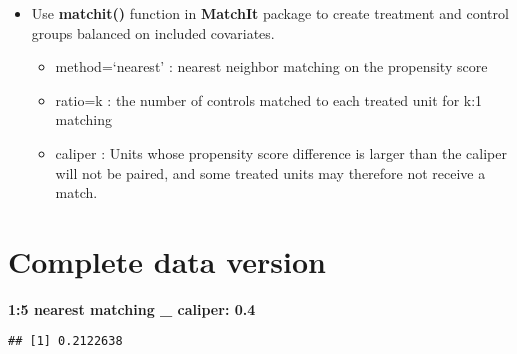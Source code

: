 \documentclass[
]{book}
\newenvironment{Shaded}{\begin{snugshade}}{\end{snugshade}}
\newcommand{\AttributeTok}[1]{\textcolor[rgb]{0.77,0.63,0.00}{#1}}
\newcommand{\DocumentationTok}[1]{\textcolor[rgb]{0.56,0.35,0.01}{\textbf{\textit{#1}}}}
\newcommand{\FloatTok}[1]{\textcolor[rgb]{0.00,0.00,0.81}{#1}}
\newcommand{\FunctionTok}[1]{\textcolor[rgb]{0.00,0.00,0.00}{#1}}
\newcommand{\NormalTok}[1]{#1}
\newcommand{\OtherTok}[1]{\textcolor[rgb]{0.56,0.35,0.01}{#1}}
\newcommand{\SpecialCharTok}[1]{\textcolor[rgb]{0.00,0.00,0.00}{#1}}
\newcommand{\StringTok}[1]{\textcolor[rgb]{0.31,0.60,0.02}{#1}}
\providecommand{\tightlist}{%
  \setlength{\itemsep}{0pt}\setlength{\parskip}{0pt}}
\theoremstyle{definition}
\theoremstyle{definition}
\theoremstyle{definition}
\theoremstyle{definition}
\theoremstyle{remark}
\begin{document}
\begin{itemize}
\tightlist
\item
  Use \textbf{matchit()} function in \textbf{MatchIt} package to create treatment and control groups balanced on included covariates.

  \begin{itemize}
  \tightlist
  \item
    method=`nearest' : nearest neighbor matching on the propensity score
  \item
    ratio=k : the number of controls matched to each treated unit for k:1 matching\\
  \item
    caliper : Units whose propensity score difference is larger than the caliper will not be paired, and some treated units may therefore not receive a match.
  \end{itemize}
\end{itemize}

\hypertarget{complete-data-version}{%
\section{Complete data version}\label{complete-data-version}}

\textbf{1:5 nearest matching \_ caliper: 0.4}

\begin{Shaded}
\end{Shaded}

\begin{verbatim}
## [1] 0.2122638
\end{verbatim}
\end{document}
